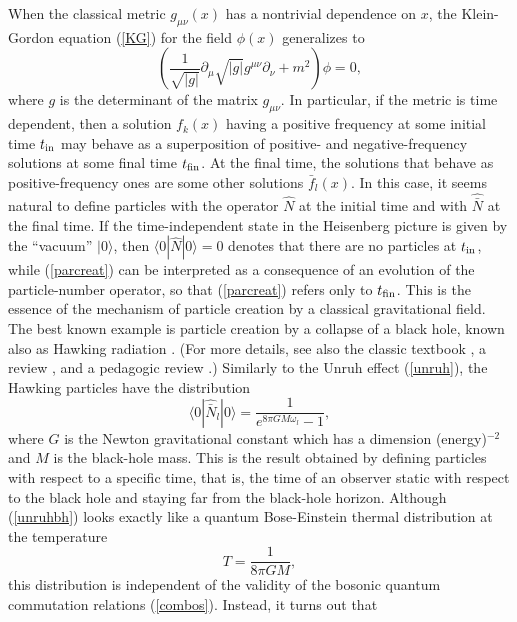\documentclass[12pt]{article}
\begin{document}
When the classical metric $g_{\mu\nu}(x)$ has a nontrivial dependence on 
$x$, the Klein-Gordon equation (\ref{KG}) for the field 
$\phi(x)$ generalizes to
\begin{equation}
\left(
\frac{1}{\sqrt{|g|}} \partial_{\mu}\sqrt{|g|} g^{\mu\nu}\partial_{\nu}
+m^2 \right) \phi=0 ,
\end{equation}
where $g$ is the determinant of the matrix $g_{\mu\nu}$.
In particular, if the metric is time dependent, then
a solution $f_k(x)$ having a positive frequency at some initial time
$t_{\rm in}$ may behave as a superposition of positive- and 
negative-frequency solutions at some final time $t_{\rm fin}$. 
At the final time, 
the solutions that behave as positive-frequency ones are some other 
solutions $\bar{f}_l(x)$. In this case, it seems natural 
to define particles with the operator $\hat{N}$ at the initial time 
and with $\hat{\bar{N}}$ at the final time. If the time-independent state
in the Heisenberg picture is given by the ``vacuum'' $|0\rangle$, 
then $\langle 0|\hat{N}|0\rangle=0$ denotes that there are no 
particles at $t_{\rm in}$, while
(\ref{parcreat}) can be interpreted as a consequence of an evolution
of the particle-number operator, so that (\ref{parcreat})
refers only to $t_{\rm fin}$. This is the essence of the 
mechanism of particle creation by a classical gravitational 
field. The best known example is particle creation by a
collapse of a black hole, known also as Hawking radiation 
\cite{hawk}. (For more details, see also the classic textbook 
\cite{birdav}, a review \cite{brout}, and a pedagogic review \cite{jacob}.)
Similarly to the Unruh effect (\ref{unruh}), the Hawking particles 
have the distribution 
\begin{equation}\label{unruhbh}
\langle 0|\hat{\bar{N}}_l|0\rangle=\frac{1}{e^{8\pi GM\omega_l}-1},
\end{equation}
where $G$ is the Newton gravitational constant which has a dimension
(energy)$^{-2}$ and $M$ is the black-hole mass.
This is the result obtained by defining particles with respect to
a specific time, that is, the 
time of an observer static with respect to the black hole and staying 
far from the black-hole horizon. 
Although (\ref{unruhbh}) looks exactly like a quantum 
Bose-Einstein thermal distribution at the temperature
\begin{equation}\label{Thawk}
T=\frac{1}{8\pi GM} ,
\end{equation}
this distribution is independent of the validity of the 
bosonic quantum commutation relations (\ref{combos}).
Instead, it turns out that 
\end{document}
